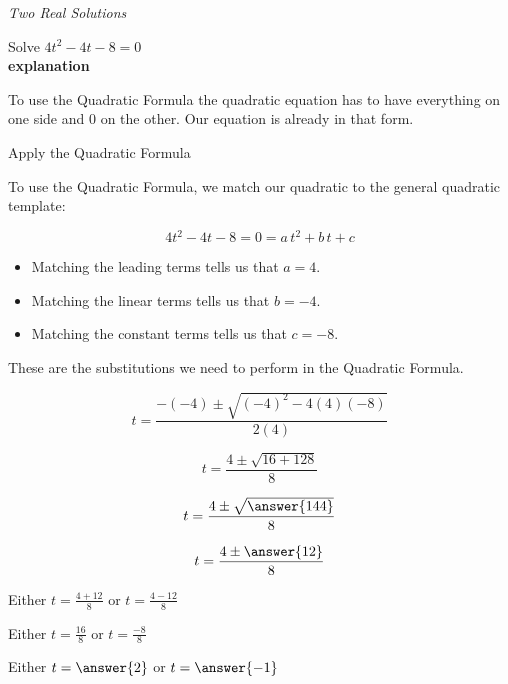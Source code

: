 \documentclass{ximera}
\begin{document}
\begin{example} \textit{Two Real Solutions} 

Solve $4 t^2 - 4 t - 8 = 0$ \\


\textbf{explanation}


To use the Quadratic Formula the quadratic equation has to have everything on one side and $0$ on the other.  Our equation is already in that form.

Apply the Quadratic Formula




To use the Quadratic Formula, we match our quadratic to the general quadratic template:

\[
4 t^2 - 4 t - 8 = 0 = a \, t^2 + b \, t + c
\]


\begin{itemize}
\item Matching the leading terms tells us that $a = 4$.
\item Matching the linear terms tells us that $b = -4$.
\item Matching the constant terms tells us that $c = -8$.
\end{itemize}

These are the substitutions we need to perform in the Quadratic Formula.


















\[   t = \frac{-(-4) \pm \sqrt{(-4)^2 - 4 (4) (-8)}}{2 (4)}            \]

\[   t = \frac{4 \pm \sqrt{16 + 128}}{8}            \]

\[   t = \frac{4 \pm \sqrt{\answer{144}}}{8}            \]

\[   t = \frac{4 \pm \answer{12}}{8}            \]




Either $t = \frac{4 + 12}{8} $ or $t = \frac{4 - 12}{8} $

Either $t = \frac{16}{8} $ or $t = \frac{-8}{8} $

Either $t = \answer{2}$ or $t = \answer{-1}$



\end{example}
\end{document}
